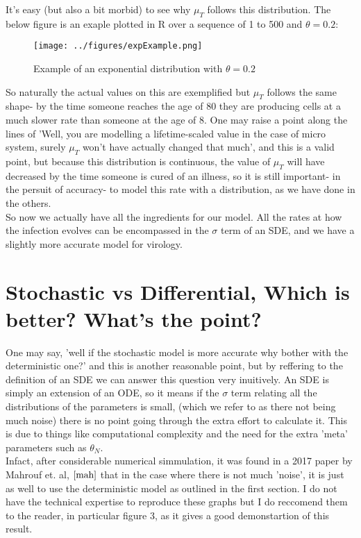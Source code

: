 It's easy (but also a bit morbid) to see why $\mu_T$ follows this distribution. The below figure is an exaple plotted in R over a sequence of 1 to 500 and $\theta = 0.2$:

\begin{figure}[h]
    \centering
    \texttt{[image: ../figures/expExample.png]}
    \caption{Example of an exponential distribution with $\theta=0.2$}
\end{figure}

So naturally the actual values on this are exemplified but $\mu_T$ follows the same shape- by the time someone reaches the age of 80 they are producing cells at a much slower rate than someone at the age of 8. One may raise a point along the lines of 'Well, you are modelling a lifetime-scaled value in the case of micro system, surely $\mu_T$ won't have actually changed that much', and this is a valid point, but because this distribution is continuous, the value of $\mu_T$ will have decreased by the time someone is cured of an illness, so it is still important- in the persuit of accuracy- to model this rate with a distribution, as we have done in the others. \\

So now we actually have all the ingredients for our model. All the rates at how the infection evolves can be encompassed in the  $\sigma$ term of an SDE, and we have a slightly more accurate model for virology. \\

\section{Stochastic vs Differential, Which is better? What's the point?}

One may say, 'well if the stochastic model is more accurate why bother with the deterministic one?' and this is another reasonable point, but by reffering to the definition of an SDE we can answer this question very inuitively. An SDE is simply an extension of an ODE, so it means if the $\sigma$ term relating all the distributions of the parameters is small, (which we refer to as there not being much noise) there is no point going through the extra effort to calculate it. This is due to things like computational complexity and the need for the extra 'meta' parameters such as  $\theta_N$. \\ 

Infact, after considerable numerical simmulation, it was found in a 2017 paper by Mahrouf et. al, $\cite{mah}$ that in the case where there is not much 'noise', it is just as well to use the deterministic model as outlined in the first section. I do not have the technical expertise to reproduce these graphs but I do reccomend them to the reader, in particular figure 3, as it gives a good demonstartion of this result. \\

